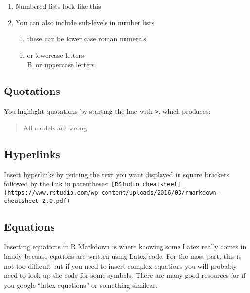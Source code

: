 \documentclass[]{article}
\providecommand{\tightlist}{%
  \setlength{\itemsep}{0pt}\setlength{\parskip}{0pt}}
\begin{document}
\begin{enumerate}
\def\labelenumi{\arabic{enumi}.}
\item
  Numbered lists look like this
\item
  You can also include sub-levels in number lists

  \begin{enumerate}
  \def\labelenumii{\roman{enumii})}
  \tightlist
  \item
    these can be lower case roman numerals\\
  \end{enumerate}

  \begin{enumerate}
  \def\labelenumii{\alph{enumii}.}
  \tightlist
  \item
    or lowercase letters\\
    B. or uppercase letters
  \end{enumerate}
\end{enumerate}

\hypertarget{quotations}{%
\subsection{Quotations}\label{quotations}}

You highlight quotations by starting the line with
\texttt{\textgreater{}}, which produces:

\begin{quote}
All models are wrong
\end{quote}

\hypertarget{hyperlinks}{%
\subsection{Hyperlinks}\label{hyperlinks}}

Insert hyperlinks by putting the text you want displayed in square
brackets followed by the link in parentheses:
\texttt{{[}RStudio\ cheatsheet{]}(https://www.rstudio.com/wp-content/uploads/2016/03/rmarkdown-cheatsheet-2.0.pdf)}

\hypertarget{equations}{%
\subsection{Equations}\label{equations}}

Inserting equations in R Markdown is where knowing some Latex really
comes in handy becuase eqations are written using Latex code. For the
most part, this is not too difficult but if you need to insert complex
equations you will probably need to look up the code for some symbols.
There are many good resources for if you google ``latex equations'' or
something similear.
\end{document}
